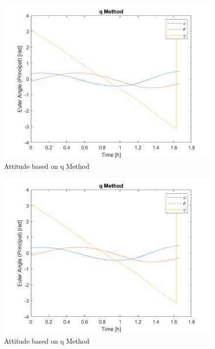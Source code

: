\begin{figure}[H]
\centering
\includegraphics[scale=0.7]{Images/ps6_problem6_qMethod.png}
\caption{Attitude based on q Method}
\label{fig:Images/ps6_problem6_qMethod}
\end{figure}

\begin{figure}[H]
\centering
\includegraphics[scale=0.7]{Images/ps6_problem6_qMethod.png}
\caption{Attitude based on q Method}
\label{fig:Images/ps6_problem6_qMethod}
\end{figure}